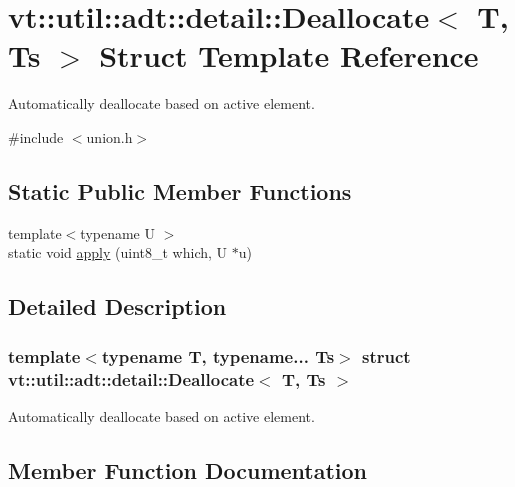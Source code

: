 \hypertarget{structvt_1_1util_1_1adt_1_1detail_1_1_deallocate}{}\section{vt\+:\+:util\+:\+:adt\+:\+:detail\+:\+:Deallocate$<$ T, Ts $>$ Struct Template Reference}
\label{structvt_1_1util_1_1adt_1_1detail_1_1_deallocate}


Automatically deallocate based on active element.  




{\ttfamily \#include $<$union.\+h$>$}

\subsection*{Static Public Member Functions}
\begin{DoxyCompactItemize}
\item 
{\footnotesize template$<$typename U $>$ }\\static void \hyperlink{structvt_1_1util_1_1adt_1_1detail_1_1_deallocate_acddc822ef340e52b2baee491fe65e30e}{apply} (uint8\+\_\+t which, U $\ast$u)
\end{DoxyCompactItemize}


\subsection{Detailed Description}
\subsubsection*{template$<$typename T, typename... Ts$>$\newline
struct vt\+::util\+::adt\+::detail\+::\+Deallocate$<$ T, Ts $>$}

Automatically deallocate based on active element. 

\subsection{Member Function Documentation}
\mbox{\label{structvt_1_1util_1_1adt_1_1detail_1_1_deallocate_acddc822ef340e52b2baee491fe65e30e}} 
